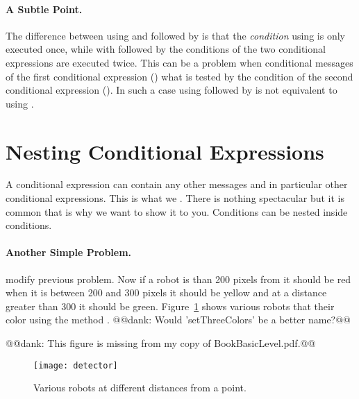 {\paragraph{A Subtle Point.}  The difference between using \add{,} and  followed by   is that the \textit{condition} using  is only executed once, while with  followed by  the conditions of the two conditional expressions are executed twice. This can be a problem when  conditional messages of the first conditional expression ()  what is tested by the condition of the second conditional expression (). In such a case using  followed by  is not equivalent to using .



\section{Nesting Conditional Expressions}
A conditional expression can contain any other messages and in particular other conditional expressions. This is what we . There is nothing spectacular  but it is common  that is 
why we want to show it to you. Conditions can be nested inside conditions.

\paragraph{Another Simple Problem.}
 modify  previous problem. Now  if a robot is  than 200 pixels from  it should be red\replace{,}{;} when it is between 200 and 300 pixels  it should be yellow\add{;} and at a distance greater than 300\add{,} it should be green.  Figure~\ref{fig:detector} shows various robots that  their color using the method . @@dank: Would 'setThreeColors' be a better name?@@

@@dank: This figure is missing from my copy of BookBasicLevel.pdf.@@
\begin{figure}
\begin{center}
\texttt{[image: detector]}
\caption{Various robots at different distances from a point. \label{fig:detector}}
\end{center}
\end{figure}

}
